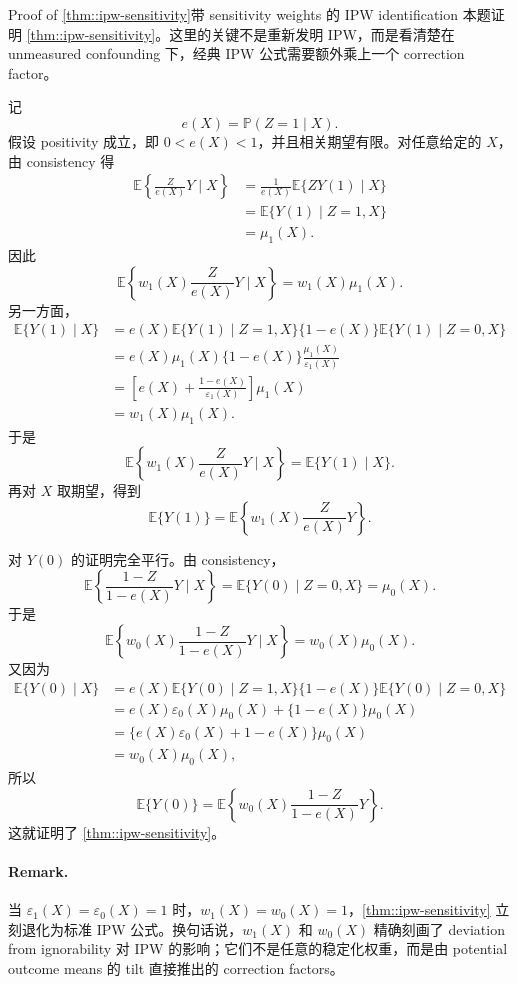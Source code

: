 \begin{exercisesolution}{Proof of \cref{thm::ipw-sensitivity}}{带 sensitivity weights 的 IPW identification}
本题证明 \cref{thm::ipw-sensitivity}。这里的关键不是重新发明 IPW，而是看清楚在 unmeasured confounding 下，经典 IPW 公式需要额外乘上一个 correction factor。

记
\[
e(X)=\mathbb{P}(Z=1\mid X).
\]
假设 positivity 成立，即 $0<e(X)<1$，并且相关期望有限。对任意给定的 $X$，由 consistency 得
\begin{align*}
\mathbb{E}\left\{\frac{Z}{e(X)}Y\mid X\right\}
&=
\frac{1}{e(X)}\mathbb{E}\{ZY(1)\mid X\}\\
&=
\mathbb{E}\{Y(1)\mid Z=1,X\}\\
&=
\mu_1(X).
\end{align*}
因此
\[
\mathbb{E}\left\{w_1(X)\frac{Z}{e(X)}Y\mid X\right\}
=w_1(X)\mu_1(X).
\]
另一方面，
\begin{align*}
\mathbb{E}\{Y(1)\mid X\}
&=
e(X)\mathbb{E}\{Y(1)\mid Z=1,X\}
\{1-e(X)\}\mathbb{E}\{Y(1)\mid Z=0,X\}\\
&=
e(X)\mu_1(X)
\{1-e(X)\}\frac{\mu_1(X)}{\varepsilon_1(X)}\\
&=
\left[e(X)+\frac{1-e(X)}{\varepsilon_1(X)}\right]\mu_1(X)\\
&=
w_1(X)\mu_1(X).
\end{align*}
于是
\[
\mathbb{E}\left\{w_1(X)\frac{Z}{e(X)}Y\mid X\right\}
=
\mathbb{E}\{Y(1)\mid X\}.
\]
再对 $X$ 取期望，得到
\[
\mathbb{E}\{Y(1)\}
=
\mathbb{E}\left\{w_1(X)\frac{Z}{e(X)}Y\right\}.
\]

对 $Y(0)$ 的证明完全平行。由 consistency，
\[
\mathbb{E}\left\{\frac{1-Z}{1-e(X)}Y\mid X\right\}
=
\mathbb{E}\{Y(0)\mid Z=0,X\}
=
\mu_0(X).
\]
于是
\[
\mathbb{E}\left\{w_0(X)\frac{1-Z}{1-e(X)}Y\mid X\right\}
=w_0(X)\mu_0(X).
\]
又因为
\begin{align*}
\mathbb{E}\{Y(0)\mid X\}
&=
e(X)\mathbb{E}\{Y(0)\mid Z=1,X\}
\{1-e(X)\}\mathbb{E}\{Y(0)\mid Z=0,X\}\\
&=
e(X)\varepsilon_0(X)\mu_0(X)+\{1-e(X)\}\mu_0(X)\\
&=
\{e(X)\varepsilon_0(X)+1-e(X)\}\mu_0(X)\\
&=
w_0(X)\mu_0(X),
\end{align*}
所以
\[
\mathbb{E}\{Y(0)\}
=
\mathbb{E}\left\{w_0(X)\frac{1-Z}{1-e(X)}Y\right\}.
\]
这就证明了 \cref{thm::ipw-sensitivity}。

\paragraph{Remark.}
当 $\varepsilon_1(X)=\varepsilon_0(X)=1$ 时，$w_1(X)=w_0(X)=1$，\cref{thm::ipw-sensitivity} 立刻退化为标准 IPW 公式。换句话说，$w_1(X)$ 和 $w_0(X)$ 精确刻画了 deviation from ignorability 对 IPW 的影响；它们不是任意的稳定化权重，而是由 potential outcome means 的 tilt 直接推出的 correction factors。
\end{exercisesolution}

